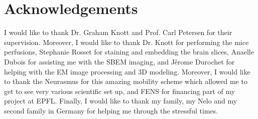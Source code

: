 \chapter*{Acknowledgements}
\label{acknowledgements}
I would like to thank Dr. Graham Knott and Prof. Carl Petersen for their supervision.
Moreover, I would like to thank Dr. Knott for performing the mice perfusions, Stephanie
Rosset for staining and embedding the brain slices, Anaelle Dubois for assisting me with the SBEM imaging, and Jêrome Durochet for helping with the EM image processing
and 3D modeling. Moreover, I would like to thank the Neurasmus for this amazing
mobility scheme which allowed me to get to see very various scientific set up, and FENS
for financing part of my project at EPFL. Finally, I would like to thank my family, my
Nelo and my second family in Germany for helping me through the stressful times.